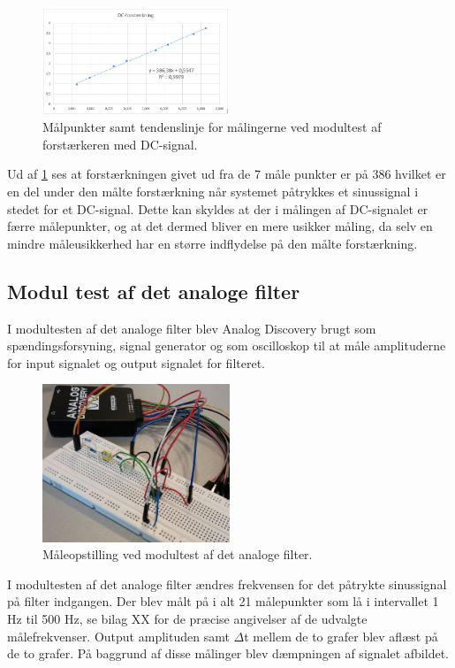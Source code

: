 \begin{figure}[H]
	\centering
	\includegraphics[width=0.5\textwidth]{Figurer/Hardware/DCforstaerkning}
	\caption{Målpunkter samt tendenslinje for målingerne ved modultest af forstærkeren med DC-signal.}
	\label{fig:DCModul}
\end{figure}

Ud af \ref{fig:DCModul} ses at forstærkningen givet ud fra de 7 måle punkter er på 386 hvilket er en del under den målte forstærkning når systemet påtrykkes et sinussignal i stedet for et DC-signal. Dette kan skyldes at der i målingen af DC-signalet er færre målepunkter, og at det dermed bliver en mere usikker måling, da selv en mindre måleusikkerhed har en større indflydelse på den målte forstærkning.

\subsection{Modul test af det analoge filter}
I modultesten af det analoge filter blev Analog Discovery brugt som spændingsforsyning, signal generator og som oscilloskop til at måle amplituderne for input signalet og output signalet for filteret.

\begin{figure}[H]
	\centering
	\includegraphics[width=0.5\textwidth]{Figurer/Hardware/FilterTest}
	\caption{Måleopstilling ved modultest af det analoge filter.}
	\label{fig:FilterTest}
\end{figure}

I modultesten af det analoge filter ændres frekvensen for det påtrykte sinussignal på filter indgangen. Der blev målt på i alt 21 målepunkter som lå i intervallet 1 Hz til 500 Hz, se bilag XX for de præcise angivelser af de udvalgte målefrekvenser. Output amplituden samt $\Delta$t mellem de to grafer blev aflæst på de to grafer. På baggrund af disse målinger blev dæmpningen af signalet afbildet. 

